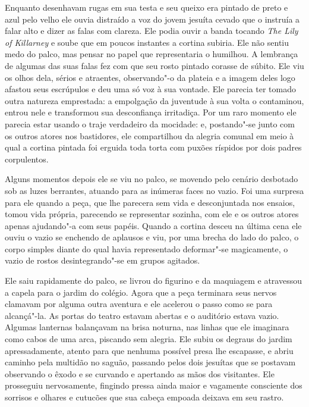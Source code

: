 Enquanto desenhavam rugas em sua testa e seu queixo era pintado de preto
e azul pelo velho ele ouvia distraído a voz do jovem jesuíta cevado que
o instruía a falar alto e dizer as falas com clareza. Ele podia ouvir a
banda tocando \textit{The Lily of Killarney} e soube que em poucos
instantes a cortina subiria. Ele não sentiu medo do palco, mas pensar
no papel que representaria o humilhou. A lembrança de algumas das
suas falas fez com que seu rosto pintado corasse de súbito. Ele viu
os olhos dela, sérios e atraentes, observando"-o da plateia e a imagem
deles logo afastou seus escrúpulos e deu uma só voz à sua vontade. Ele
parecia ter tomado outra natureza emprestada: a empolgação da juventude
à sua volta o contaminou, entrou nele e transformou sua desconfiança
irritadiça. Por um raro momento ele parecia estar usando o traje
verdadeiro da mocidade: e, postando"-se junto com os outros atores nos
bastidores, ele compartilhou da alegria comunal em meio à qual a
cortina pintada foi erguida toda torta com puxões ríspidos por dois
padres corpulentos.

Alguns momentos depois ele se viu no palco, se movendo pelo cenário
desbotado sob as luzes berrantes, atuando para as inúmeras faces no
vazio. Foi uma surpresa para ele quando a peça, que lhe parecera sem
vida e desconjuntada nos ensaios, tomou vida própria, parecendo se
representar sozinha, com ele e os outros atores apenas ajudando"-a com
seus papéis. Quando a cortina desceu na última cena ele ouviu o vazio
se enchendo de aplausos e viu, por uma brecha do lado do palco, o corpo
simples diante do qual havia representado deformar"-se magicamente, o
vazio de rostos desintegrando"-se em grupos agitados.

Ele saiu rapidamente do palco, se livrou do figurino e da maquiagem e
atravessou a capela para o jardim do colégio. Agora que a peça terminara
seus nervos clamavam por alguma outra aventura e ele acelerou o passo
como se para alcançá"-la. As portas do teatro estavam abertas e o
auditório estava vazio. Algumas lanternas balançavam na brisa noturna,
nas linhas que ele imaginara como cabos de uma arca, piscando sem
alegria. Ele subiu os degraus do jardim apressadamente, atento para que
nenhuma possível presa lhe escapasse, e abriu caminho pela multidão no
saguão, passando pelos dois jesuítas que se postavam observando o êxodo
e se curvando e apertando as mãos dos visitantes. Ele prosseguiu
nervosamente, fingindo pressa ainda maior e vagamente consciente dos
sorrisos e olhares e cutucões que sua cabeça empoada deixava em seu
rastro.

